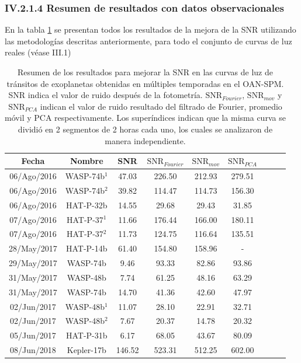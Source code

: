 \newpage
\subsubsection*{IV.2.1.4 Resumen de resultados con datos observacionales}

En la tabla \ref{tab_resultados_obs} se presentan todos los resultados de la mejora de la SNR utilizando las metodologías descritas anteriormente, para todo el conjunto de curvas de luz reales (véase III.1)

\begin{table}[h!]
	\centering
	\begin{tabular}{ccccccccc}
	\hline 
	Fecha & Nombre & SNR & $\mbox{SNR}_{Fourier}$ &  $\mbox{SNR}_{mov}$ & $\mbox{SNR}_{PCA}$\\ 
	\hline
	06/Ago/2016 & WASP-74b$^{1}$ & 47.03 & 226.50 & 212.93 & 279.51 \\ 
	06/Ago/2016 & WASP-74b$^{2}$ & 39.82 & 114.47 & 114.73 & 156.30 \\
	06/Ago/2016 & HAT-P-32b & 14.55 & 29.68 & 29.43 & 31.85 \\
	07/Ago/2016 & HAT-P-37$^{1}$ & 11.66 & 176.44 & 166.00 & 180.11 \\ 
	07/Ago/2016 & HAT-P-37$^{2}$ & 11.73 & 124.75 & 116.64 & 135.51 \\ 
	28/May/2017 & HAT-P-14b & 61.40 & 154.80 & 158.96 & - \\ 
	29/May/2017 & WASP-74b & 9.46 & 93.33 & 82.86 & 93.86 \\
	31/May/2017 & WASP-48b & 7.74 & 61.25 & 48.16 & 63.29 \\  
	31/May/2017 & WASP-74b & 14.70 & 41.36 & 42.60 & 47.97 \\
	02/Jun/2017 & WASP-48b$^{1}$ & 11.07 & 28.10 & 22.91 & 32.71 \\
	02/Jun/2017 & WASP-48b$^{2}$ & 7.67 & 20.37 & 14.78 & 20.32 \\
	05/Jun/2017 & HAT-P-31b & 6.17 & 68.05 & 43.67 & 80.09 \\
	08/Jun/2018 & Kepler-17b & 146.52 & 523.31 & 512.25 & 602.00 \\ 
	\hline 
	\end{tabular} 
	\caption{Resumen de los resultados para mejorar la SNR en las curvas de luz de tránsitos de exoplanetas obtenidas en múltiples temporadas en el OAN-SPM. SNR indica el valor de ruido después de la fotometría. $\mbox{SNR}_{Fourier}$, $\mbox{SNR}_{mov}$ y $\mbox{SNR}_{PCA}$ indican el valor de ruido resultado del filtrado de Fourier, promedio móvil y PCA respectivamente. Los superíndices indican que la misma curva se dividió en 2 segmentos de 2 horas cada uno, los cuales se analizaron de manera independiente.}
	\label{tab_resultados_obs}
	\end{table}


